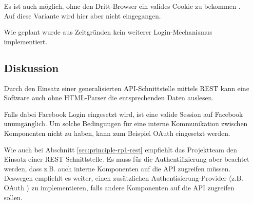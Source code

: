 Es ist auch möglich, ohne den Dritt-Browser ein valides Cookie zu bekommen \cite{facebookLoginGist}. Auf diese Variante wird hier aber nicht eingegangen.

Wie geplant wurde aus Zeitgründen kein weiterer Login-Mechanismus implementiert.

\subsection*{Diskussion}
Durch den Einsatz einer generalisierten API-Schnittstelle mittels \gls{REST} kann eine Software auch ohne HTML-Parser die entsprechenden Daten auslesen.

Falls dabei Facebook Login eingesetzt wird, ist eine valide Session auf Facebook unumgänglich. Um solche Bedingungen für eine interne Kommunikation zwischen Komponenten nicht zu haben, kann zum Beispiel OAuth \cite{oauth} eingesetzt werden.

Wie auch bei Abschnitt \ref{sec:principle-rp1-rest} empfiehlt das Projektteam den Einsatz einer REST Schnittstelle. Es muss für die Authentifizierung aber beachtet werden, dass z.B. auch interne Komponenten auf die API zugreifen müssen. Deswegen empfiehlt es weiter, einen zusätzlichen Authentisierung-Provider (z.B. OAuth \cite{oauth}) zu implementieren, falls andere Komponenten auf die API zugreifen sollen.